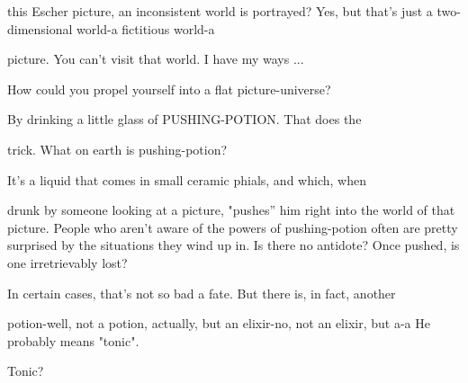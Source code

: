 this Escher picture, an inconsistent world is portrayed? 
\achilles Yes, but that's just a two-dimensional world-a fictitious world-a\par
picture. You can't visit that world. 
\tortoise I have my ways ...\par

\achilles How could you propel yourself into a flat picture-universe?\par

\tortoise By drinking a little glass of PUSHING-POTION. That does the\par
trick. 
\achilles What on earth is pushing-potion?\par

\tortoise It's a liquid that comes in small ceramic phials, and which, when\par
drunk by someone looking at a picture, "pushes'' him right into the world of that picture. People who aren't aware of the powers of pushing-potion often are pretty surprised by the situations they wind up in. 
\achilles Is there no antidote? Once pushed, is one irretrievably lost?\par

\tortoise In certain cases, that's not so bad a fate. But there is, in fact, another\par
potion-well, not a potion, actually, but an elixir-no, not an elixir, but a-a 
\tortoise He probably means "tonic".\par

\achilles Tonic?\par
\bye
